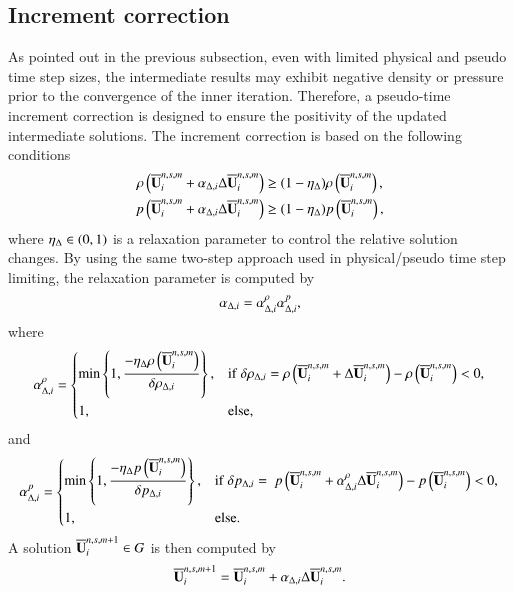 \subsection{Increment correction}
\label{ssec:increment-correction}

As pointed out in the previous subsection, even with limited physical and pseudo time step sizes, the intermediate results may exhibit negative density or pressure prior to the convergence of the inner iteration.
Therefore, a pseudo-time increment correction is designed to ensure the positivity of the updated intermediate solutions.
The increment correction is based on the following conditions
\begin{equation}
    \label{eq:ppLimitInc}
    \begin{aligned}
        \rho\left(\overline{\mathbf{U}}_i^{n,s,m} + \alpha_{\mathrm\Delta,i} \mathrm\Delta \overline{\mathbf{U}}_i^{n,s,m}\right)
         & \geq
        (1- \eta_\mathrm\Delta)
        \rho\left(\overline{\mathbf{U}}_i^{n,s,m}\right), \\
        p\left(\overline{\mathbf{U}}_i^{n,s,m} + \alpha_{\mathrm\Delta,i} \mathrm\Delta \overline{\mathbf{U}}_i^{n,s,m}\right)
         & \geq
        (1- \eta_\mathrm\Delta)
        p\left(\overline{\mathbf{U}}_i^{n,s,m}\right),
    \end{aligned}
\end{equation}
where $\eta_\mathrm\Delta \in (0,1)$ is a relaxation parameter to control the relative solution changes.
By using the same two-step approach used in physical/pseudo time step limiting, the relaxation parameter is computed by
\begin{equation}
\label{eq:alpha-inc}
    \alpha_{\mathrm\Delta,i}= \alpha_{\mathrm\Delta,i}^{\rho} \alpha_{\mathrm\Delta,i}^{p},
\end{equation}
where
\begin{equation}
\label{eq:alpha-inc-rho}
    \alpha_{\mathrm\Delta,i}^{\rho} = \begin{dcases}
        \min\left\{1, \dfrac{-\eta_\mathrm\Delta \rho\left(\overline{\mathbf{U}}^{n,s,m}_i\right)}{\delta \rho_{\mathrm\Delta,i}} \right\}, & \mathrm{if} \ \delta \rho_{\mathrm\Delta,i} = \rho\left(\overline{\mathbf{U}}^{n,s,m}_i +\mathrm\Delta \overline{\mathbf{U}}_i^{n,s,m}\right)  -\rho\left(\overline{\mathbf{U}}^{n,s,m}_i\right) < 0, \\
        1, &
        \mathrm{else},
    \end{dcases}
\end{equation}
and
\begin{equation}
\label{eq:alpha-inc-p}
    \alpha_{\mathrm\Delta,i}^{p} = \begin{dcases}
        \min\left\{1, \dfrac{-\eta_\mathrm\Delta p \left(\overline{\mathbf{U}}^{n,s,m}_i\right)}{\delta p_{\mathrm\Delta,i}} \right\}, & \mathrm{if} \ \delta p_{\mathrm\Delta,i} = \ p \left(\overline{\mathbf{U}}^{n,s,m}_i + \alpha_{\mathrm\Delta,i}^{\rho} \mathrm\Delta \overline{\mathbf{U}}_i^{n,s,m}\right) - p \left(\overline{\mathbf{U}}^{n,s,m}_i\right) < 0, \\
        1, &
        \mathrm{else}.
    \end{dcases}
\end{equation}
A solution $\overline{\mathbf{U}}^{n,s,m+1}_i \in G$ is then computed by
\begin{equation}
\label{eq:increment-correction}
    \overline{\mathbf{U}}_i^{n,s,m+1} = \overline{\mathbf{U}}_i^{n,s,m} + \alpha_{\mathrm\Delta,i} \mathrm\Delta \overline{\mathbf{U}}_i^{n,s,m}.
\end{equation}

